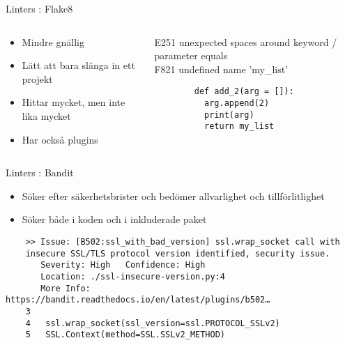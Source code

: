 \begin{frame}[fragile]{Linters : Flake8}
  \begin{columns}
    \begin{column}{0.6\linewidth}
      \begin{itemize}
        \item Mindre gnällig
        \item Lätt att bara slänga in ett projekt
        \item Hittar mycket, men inte lika mycket
        \item Har också plugins
      \end{itemize}
    \end{column}
    \begin{column}{0.4\linewidth}
      {\ttfamily\tiny
        E251 unexpected spaces around keyword / parameter equals\\
        F821 undefined name 'my\_list'
      }

      \begin{verbatim}
        def add_2(arg = []):
          arg.append(2)
          print(arg)
          return my_list
      \end{verbatim}
    \end{column}
  \end{columns}
\end{frame}

\begin{frame}[fragile]{Linters : Bandit}
  \begin{itemize}
    \item Söker efter säkerhetsbrister och bedömer allvarlighet och tillförlitlighet
    \item Söker både i koden och i inkluderade paket
  \end{itemize}

  \begin{verbatim}
    >> Issue: [B502:ssl_with_bad_version] ssl.wrap_socket call with
    insecure SSL/TLS protocol version identified, security issue.
       Severity: High   Confidence: High
       Location: ./ssl-insecure-version.py:4
       More Info: https://bandit.readthedocs.io/en/latest/plugins/b502…
    3
    4	ssl.wrap_socket(ssl_version=ssl.PROTOCOL_SSLv2)
    5	SSL.Context(method=SSL.SSLv2_METHOD)
  \end{verbatim}
\end{frame}

